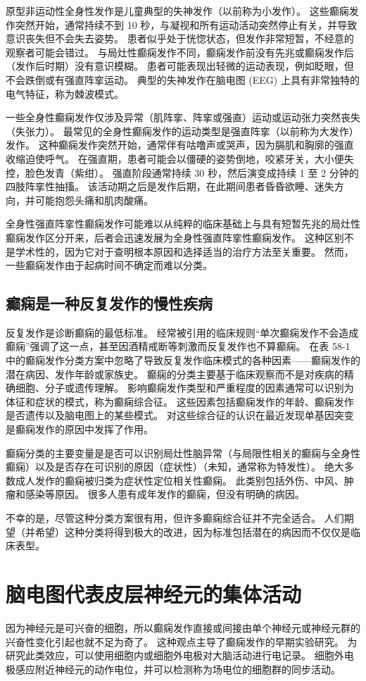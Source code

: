 原型非运动性全身性发作是儿童典型的失神发作（以前称为小发作）。 这些癫痫发作突然开始，通常持续不到 10 秒，与凝视和所有运动活动突然停止有关，并导致意识丧失但不会失去姿势。 患者似乎处于恍惚状态，但发作非常短暂，不经意的观察者可能会错过。 与局灶性癫痫发作不同，癫痫发作前没有先兆或癫痫发作后（发作后时期）没有意识模糊。 患者可能表现出轻微的运动表现，例如眨眼，但不会跌倒或有强直阵挛运动。 典型的失神发作在脑电图 (EEG) 上具有非常独特的电气特征，称为棘波模式。

一些全身性癫痫发作仅涉及异常（肌阵挛、阵挛或强直）运动或运动张力突然丧失（失张力）。 最常见的全身性癫痫发作的运动类型是强直阵挛（以前称为大发作）发作。 这种癫痫发作突然开始，通常伴有咕噜声或哭声，因为膈肌和胸廓的强直收缩迫使呼气。 在强直期，患者可能会以僵硬的姿势倒地，咬紧牙关，大小便失控，脸色发青（紫绀）。 强直阶段通常持续 30 秒，然后演变成持续 1 至 2 分钟的四肢阵挛性抽搐。 该活动期之后是发作后期，在此期间患者昏昏欲睡、迷失方向，并可能抱怨头痛和肌肉酸痛。

全身性强直阵挛性癫痫发作可能难以从纯粹的临床基础上与具有短暂先兆的局灶性癫痫发作区分开来，后者会迅速发展为全身性强直阵挛性癫痫发作。 这种区别不是学术性的，因为它对于查明根本原因和选择适当的治疗方法至关重要。 然而，一些癫痫发作由于起病时间不确定而难以分类。


\subsection{癫痫是一种反复发作的慢性疾病}
反复发作是诊断癫痫的最低标准。 经常被引用的临床规则“单次癫痫发作不会造成癫痫”强调了这一点，甚至因酒精戒断等刺激而反复发作也不算癫痫。 在表 58-1 中的癫痫发作分类方案中忽略了导致反复发作临床模式的各种因素——癫痫发作的潜在病因、发作年龄或家族史。 癫痫的分类主要基于临床观察而不是对疾病的精确细胞、分子或遗传理解。 影响癫痫发作类型和严重程度的因素通常可以识别为体征和症状的模式，称为癫痫综合征。 这些因素包括癫痫发作的年龄、癫痫发作是否遗传以及脑电图上的某些模式。 对这些综合征的认识在最近发现单基因突变是癫痫发作的原因中发挥了作用。

癫痫分类的主要变量是是否可以识别局灶性脑异常（与局限性相关的癫痫与全身性癫痫）以及是否存在可识别的原因（症状性）（未知，通常称为特发性）。 绝大多数成人发作的癫痫被归类为症状性定位相关性癫痫。 此类别包括外伤、中风、肿瘤和感染等原因。 很多人患有成年发作的癫痫，但没有明确的病因。

不幸的是，尽管这种分类方案很有用，但许多癫痫综合征并不完全适合。 人们期望（并希望）这种分类将得到极大的改进，因为标准包括潜在的病因而不仅仅是临床表型。


\section{脑电图代表皮层神经元的集体活动}
因为神经元是可兴奋的细胞，所以癫痫发作直接或间接由单个神经元或神经元群的兴奋性变化引起也就不足为奇了。 这种观点主导了癫痫发作的早期实验研究。 为研究此类效应，可以使用细胞内或细胞外电极对大脑活动进行电记录。 细胞外电极感应附近神经元的动作电位，并可以检测称为场电位的细胞群的同步活动。

